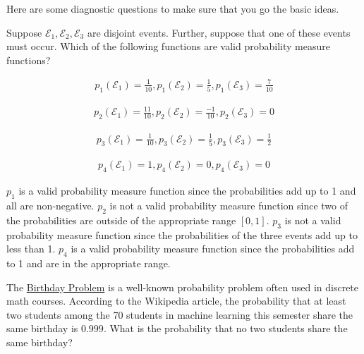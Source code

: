 \documentclass[assignment01_Solutions]{subfiles}
\begin{document}
\vspace{1em}
\begin{exercise}[(10 minutes)]
Here are some diagnostic questions to make sure that you go the basic ideas. 
\bes
\item Suppose $\mathcal{E}_1, \mathcal{E}_2, \mathcal{E}_3$ are disjoint events.  Further, suppose that one of these events must occur.  Which of the following functions are valid probability measure functions?

\begin{align}
p_1(\mathcal{E}_1)=\frac{1}{10} , p_1(\mathcal{E}_2)=\frac{1}{5}, p_1(\mathcal{E}_3)=\frac{7}{10} \nonumber
\end{align}


\begin{align}
p_2(\mathcal{E}_1)=\frac{11}{10} , p_2(\mathcal{E}_2)=\frac{-1}{10}, p_2(\mathcal{E}_3)= 0 \nonumber
\end{align}



\begin{align}
p_3(\mathcal{E}_1)=\frac{1}{10} , p_3(\mathcal{E}_2)=\frac{1}{5}, p_3(\mathcal{E}_3)=\frac{1}{2} \nonumber
\end{align}



\begin{align}
p_4(\mathcal{E}_1)=1 , p_4(\mathcal{E}_2)=0, p_4(\mathcal{E}_3)=0 \nonumber
\end{align}

\begin{boxedsolution}
$p_1$ is a valid probability measure function since the probabilities add up to 1 and all are non-negative.  $p_2$ is not a valid probability measure function since two of the probabilities are outside of the appropriate range $[0,1]$.  $p_3$ is not a valid probability measure function since the probabilities of the three events add up to less than 1. $p_4$ is a valid probability measure function since the probabilities add to 1 and are in the appropriate range.
\end{boxedsolution}

\item The \href{https://en.wikipedia.org/wiki/Birthday_problem}{Birthday Problem} is a well-known probability problem often used in discrete math courses.  According to the Wikipedia article, the probability that at least two students among the 70 students in machine learning this semester share the same birthday is $0.999$.  What is the probability that no two students share the same birthday?


\end{exercise}
\end{document}
